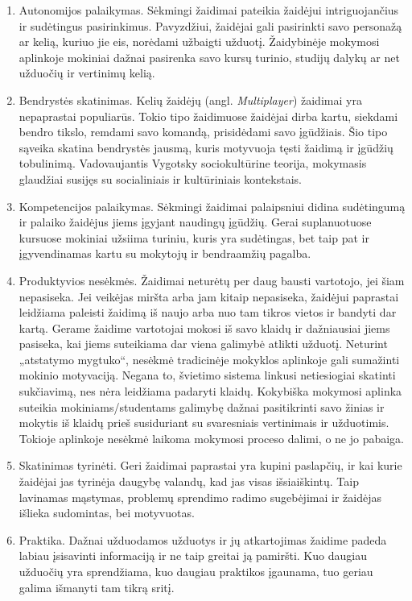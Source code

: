 \documentclass{VUMIFPSkursinis}
\begin{document}
\begin{enumerate}
    \item Autonomijos palaikymas. Sėkmingi žaidimai pateikia žaidėjui intriguojančius ir sudėtingus pasirinkimus. Pavyzdžiui, žaidėjai gali pasirinkti savo personažą ar kelią, kuriuo jie eis, norėdami užbaigti užduotį. Žaidybinėje mokymosi aplinkoje mokiniai dažnai pasirenka savo kursų turinio, studijų dalykų ar net užduočių ir vertinimų kelią.
    \item Bendrystės skatinimas. Kelių žaidėjų (angl. \textit{Multiplayer}) žaidimai yra nepaprastai populiarūs. Tokio tipo žaidimuose žaidėjai dirba kartu, siekdami bendro tikslo, remdami savo komandą, prisidėdami savo įgūdžiais. Šio tipo sąveika skatina bendrystės jausmą, kuris motyvuoja tęsti žaidimą ir įgūdžių tobulinimą. Vadovaujantis Vygotsky sociokultūrine teorija, mokymasis glaudžiai susijęs su socialiniais ir kultūriniais kontekstais. \cite{wertsch1992ls}
    \item Kompetencijos palaikymas. Sėkmingi žaidimai palaipsniui didina sudėtingumą ir palaiko žaidėjus jiems įgyjant naudingų įgūdžių. Gerai suplanuotuose kursuose mokiniai užsiima turiniu, kuris yra sudėtingas, bet taip pat ir įgyvendinamas kartu su mokytojų ir bendraamžių pagalba. \cite{vygotsky1980mind}
    \item Produktyvios nesėkmės. Žaidimai neturėtų per daug bausti vartotojo, jei šiam nepasiseka. Jei veikėjas miršta arba jam kitaip nepasiseka, žaidėjui paprastai leidžiama paleisti žaidimą iš naujo arba nuo tam tikros vietos ir bandyti dar kartą. Gerame žaidime vartotojai mokosi iš savo klaidų ir dažniausiai jiems pasiseka, kai jiems suteikiama dar viena galimybė atlikti užduotį. Neturint „atstatymo mygtuko“, nesėkmė tradicinėje mokyklos aplinkoje gali sumažinti mokinio motyvaciją. Negana to, švietimo sistema linkusi netiesiogiai skatinti sukčiavimą, nes nėra leidžiama padaryti klaidų. Kokybiška mokymosi aplinka suteikia mokiniams/studentams galimybę dažnai pasitikrinti savo žinias ir mokytis iš klaidų prieš susiduriant su svaresniais vertinimais ir užduotimis. Tokioje aplinkoje nesėkmė laikoma mokymosi proceso dalimi, o ne jo pabaiga.
    \item Skatinimas tyrinėti. Geri žaidimai paprastai yra kupini paslapčių, ir kai kurie žaidėjai jas tyrinėja daugybę valandų, kad jas visas išsiaiškintų. Taip lavinamas mąstymas, problemų sprendimo radimo sugebėjimai ir žaidėjas išlieka sudomintas, bei motyvuotas.
    \item Praktika. Dažnai užduodamos užduotys ir jų atkartojimas žaidime padeda labiau įsisavinti informaciją ir ne taip greitai ją pamiršti. Kuo daugiau užduočių yra sprendžiama, kuo daugiau praktikos įgaunama, tuo geriau galima išmanyti tam tikrą sritį. \cite{kenney_2020}
\end{enumerate}
\end{document}
